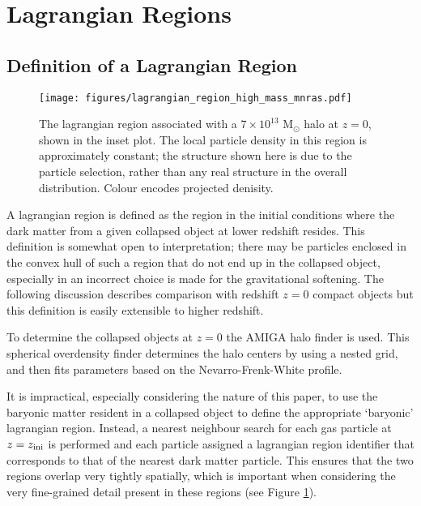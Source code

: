 \section{Lagrangian Regions}
\label{sec:lagrangianregions}

\subsection{Definition of a Lagrangian Region}

\begin{figure}
    \centering
    \texttt{[image: figures/lagrangian\_region\_high\_mass\_mnras.pdf]}
    \caption{The lagrangian region associated with a $7\times10^{13}$
	$\mathrm{M}_\odot$ halo at $z=0$, shown in the inset plot. The local
	particle density in this region is approximately constant; the
	structure shown here is due to the particle selection, rather than any
	real structure in the overall distribution. Colour encodes projected
	denisity.}
    \label{fig:lrpic}
\end{figure}

A lagrangian region is defined as the region in the initial conditions where
the dark matter from a given collapsed object at lower redshift resides. This
definition is somewhat open to interpretation; there may be particles enclosed
in the convex hull of such a region that do not end up in the collapsed object,
especially in an incorrect choice is made for the gravitational softening. The
following discussion describes comparison with redshift $z=0$ compact objects
but this definition is easily extensible to higher redshift.

To determine the collapsed objects at $z=0$ the AMIGA halo finder
\citep[AHF][]{ahfi, ahfii} is used. This spherical overdensity finder
determines the halo centers by using a nested grid, and then fits parameters
based on the Nevarro-Frenk-White \citep[NFW, ][]{nfw} profile.

It is impractical, especially considering the nature of this paper, to use the
baryonic matter resident in a collapsed object to define the appropriate
`baryonic' lagrangian region. Instead, a nearest neighbour search for each gas
particle at $z=z_{\rm ini}$ is performed and each particle assigned a
lagrangian region identifier that corresponds to that of the nearest dark
matter particle. This ensures that the two regions overlap very tightly
spatially, which is important when considering the very fine-grained detail
present in these regions (see Figure \ref{fig:lrpic}).

